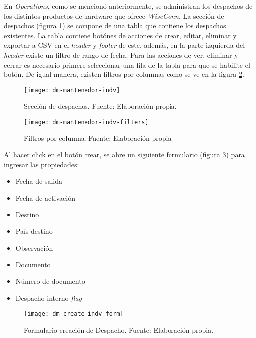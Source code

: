 
En \textit{Operations}, como se mencionó anteriormente, se administran los despachos de los distintos productos de hardware que ofrece \textit{WiseConn}.
La sección de despachos (figura \ref{fig:dm-mantenedor-indv}) se compone de una tabla que contiene los despachos existentes. La tabla contiene botónes de acciones de crear, editar, eliminar y exportar a CSV en el \textit{header} y \textit{footer} de este, además, en la parte izquierda del \textit{header} existe un filtro de rango de fecha. 
Para las acciones de ver, eliminar y cerrar es necesario primero seleccionar una fila de la tabla para que se habilite el botón.
De igual manera, existen filtros por columnas como se ve en la figura \ref{fig:dm-mantenedor-indv-filters}.

\begin{figure}[H]
	\centering
	\texttt{[image: dm-mantenedor-indv]}
	\caption{\label{fig:dm-mantenedor-indv} Sección de despachos. Fuente: Elaboración propia.}
\end{figure}

\begin{figure}[H]
	\centering
	\texttt{[image: dm-mantenedor-indv-filters]}
	\caption{\label{fig:dm-mantenedor-indv-filters} Filtros por columna. Fuente: Elaboración propia.}
\end{figure}

Al hacer click en el botón crear, se abre un siguiente formulario (figura \ref{fig:dm-create-indv-form}) para ingresar las propiedades:
\begin{itemize}
    \item Fecha de salida
    \item Fecha de activación
    \item Destino
    \item País destino
    \item Observación
    \item Documento
    \item Número de documento
    \item Despacho interno \textit{flag}    
\end{itemize}

\begin{figure}[H]
	\centering
	\texttt{[image: dm-create-indv-form]}
	\caption{\label{fig:dm-create-indv-form} Formulario creación de Despacho. Fuente: Elaboración propia.}
\end{figure}

